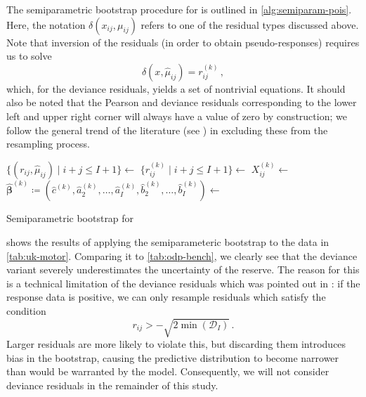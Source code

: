 \documentclass[a4paper]{book}
\begin{document}
The semiparametric bootstrap procedure for  is outlined in \cref{alg:semiparam-pois}. Here, the notation $\delta(x_{ij}, \mu_{ij})$ refers to one of the residual types discussed above. Note that inversion of the residuals (in order to obtain pseudo-responses) requires us to solve
\begin{equation}
  \delta(x, \widehat{\mu}_{ij}) = r^{(k)}_{ij} \,,
\end{equation}
which, for the deviance residuals, yields a set of nontrivial equations. It should also be noted that the Pearson and deviance residuals corresponding to the lower left and upper right corner will always have a value of zero by construction; we follow the general trend of the literature (see \cites[706]{pinheiro}[6]{verdonck}) in excluding these from the resampling process.

\begin{algorithm}
  \begin{algorithmic}
    \State $\{(r_{ij}, \widehat{\mu}_{ij}) \mid i + j \leq I + 1 \} \gets$ 
      \State $\{r^{(k)}_{ij} \mid i + j \leq I + 1 \} \gets$ 
          \State $X_{ij}^{(k)} \gets$ 
        \EndFor
      \EndFor
      \State $\widehat{\bm{\beta}}^{(k)} \coloneqq (\widehat{c}^{(k)}, \widehat{a}_2^{(k)}, \dots, \widehat{a}_I^{(k)}, \widehat{b}_2^{(k)}, \dots, \widehat{b}_I^{(k)}) \gets$ 
    \EndFor
    \State {}
  \end{algorithmic}
  \caption{Semiparametric bootstrap for }
  \label{alg:semiparam-pois}
\end{algorithm}

 shows the results of applying the semiparameteric bootstrap to the data in \cref{tab:uk-motor}. Comparing it to \cref{tab:odp-bench}, we clearly see that the deviance variant severely underestimates the uncertainty of the reserve. The reason for this is a technical limitation of the deviance residuals which was pointed out in \cite[13-14]{hartl}: if the response data is positive, we can only resample residuals which satisfy the condition
\begin{equation}
  r_{ij} > -\sqrt{2 \min({\mathcal{D}_I})} \,.
\end{equation}
Larger residuals are more likely to violate this, but discarding them introduces bias in the bootstrap, causing the predictive distribution to become narrower than would be warranted by the model. Consequently, we will not consider deviance residuals in the remainder of this study.
\end{document}

